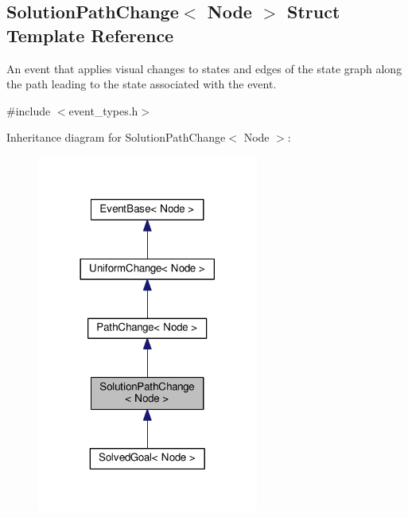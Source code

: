 \hypertarget{structSolutionPathChange}{}\subsection{Solution\+Path\+Change$<$ Node $>$ Struct Template Reference}
\label{structSolutionPathChange}


An event that applies visual changes to states and edges of the state graph along the path leading to the state associated with the event.  




{\ttfamily \#include $<$event\+\_\+types.\+h$>$}



Inheritance diagram for Solution\+Path\+Change$<$ Node $>$\+:\nopagebreak
\begin{figure}[H]
\begin{center}
\leavevmode
\includegraphics[width=206pt]{structSolutionPathChange__inherit__graph}
\end{center}
\end{figure}


